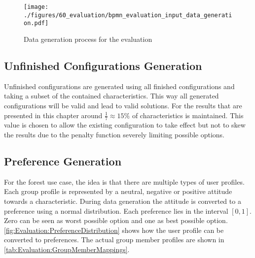 \begin{figure}
    \centering
    \texttt{[image: ./figures/60\_evaluation/bpmn\_evaluation\_input\_data\_generation.pdf]}
    \caption{Data generation process for the evaluation}
    \label{fig:Evaluation:GeneratingDataProcess}
\end{figure}

\subsection{Unfinished Configurations Generation}

Unfinished configurations are generated using all finished configurations and taking a subset of the contained characteristics. This way all generated configurations will be valid and lead to valid solutions. For the results that are presented in this chapter around $\frac{1}{7} \approx 15\%$ of characteristics is maintained. This value is chosen to allow the existing configuration to take effect but not to skew the results due to the penalty function severely limiting possible options.

\subsection{Preference Generation}

For the forest use case, the idea is that there are multiple types of user profiles. Each group profile is represented by a neutral, negative or positive attitude towards a characteristic. During data generation the attitude is converted to a preference using a normal distribution. Each preference lies in the interval $[0,1]$. Zero can be seen as worst possible option and one as best possible option. \autoref{fig:Evaluation:PreferenceDistribution} shows how the user profile can be converted to preferences. The actual group member profiles are shown in \autoref{tab:Evaluation:GroupMemberMappings}.

